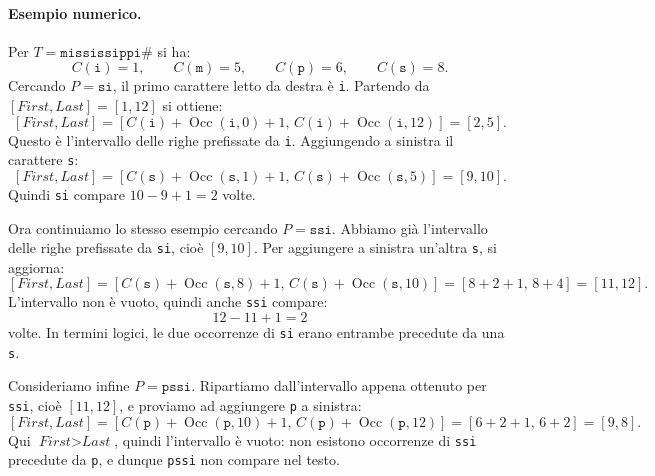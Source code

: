 \documentclass{article}
\theoremstyle{definition}
\numberwithin{equation}{section}
\begin{document}
\paragraph{Esempio numerico.}
Per $T=\texttt{mississippi\#}$ si ha:
\[
    C(\texttt{i})=1,
    \qquad
    C(\texttt{m})=5,
    \qquad
    C(\texttt{p})=6,
    \qquad
    C(\texttt{s})=8.
\]
Cercando $P=\texttt{si}$, il primo carattere letto da destra è \texttt{i}. Partendo da $[\textit{First},\textit{Last}]=[1,12]$ si ottiene:
\[
    [\textit{First},\textit{Last}]
    =
    [C(\texttt{i})+\operatorname{Occ}(\texttt{i},0)+1,\,
        C(\texttt{i})+\operatorname{Occ}(\texttt{i},12)]
    =
    [2,5].
\]
Questo è l'intervallo delle righe prefissate da \texttt{i}. Aggiungendo a sinistra il carattere \texttt{s}:
\[
    [\textit{First},\textit{Last}]
    =
    [C(\texttt{s})+\operatorname{Occ}(\texttt{s},1)+1,\,
        C(\texttt{s})+\operatorname{Occ}(\texttt{s},5)]
    =
    [9,10].
\]
Quindi \texttt{si} compare $10-9+1=2$ volte.

Ora continuiamo lo stesso esempio cercando $P=\texttt{ssi}$. Abbiamo già l'intervallo delle righe prefissate da \texttt{si}, cioè $[9,10]$. Per aggiungere a sinistra un'altra \texttt{s}, si aggiorna:
\[
    [\textit{First},\textit{Last}]
    =
    [C(\texttt{s})+\operatorname{Occ}(\texttt{s},8)+1,\,
        C(\texttt{s})+\operatorname{Occ}(\texttt{s},10)]
    =
    [8+2+1,\,8+4]
    =
    [11,12].
\]
L'intervallo non è vuoto, quindi anche \texttt{ssi} compare:
\[
    12-11+1=2
\]
volte. In termini logici, le due occorrenze di \texttt{si} erano entrambe precedute da una \texttt{s}.

Consideriamo infine $P=\texttt{pssi}$. Ripartiamo dall'intervallo appena ottenuto per \texttt{ssi}, cioè $[11,12]$, e proviamo ad aggiungere \texttt{p} a sinistra:
\[
    [\textit{First},\textit{Last}]
    =
    [C(\texttt{p})+\operatorname{Occ}(\texttt{p},10)+1,\,
        C(\texttt{p})+\operatorname{Occ}(\texttt{p},12)]
    =
    [6+2+1,\,6+2]
    =
    [9,8].
\]
Qui $\textit{First}>\textit{Last}$, quindi l'intervallo è vuoto: non esistono occorrenze di \texttt{ssi} precedute da \texttt{p}, e dunque \texttt{pssi} non compare nel testo.
\end{document}
